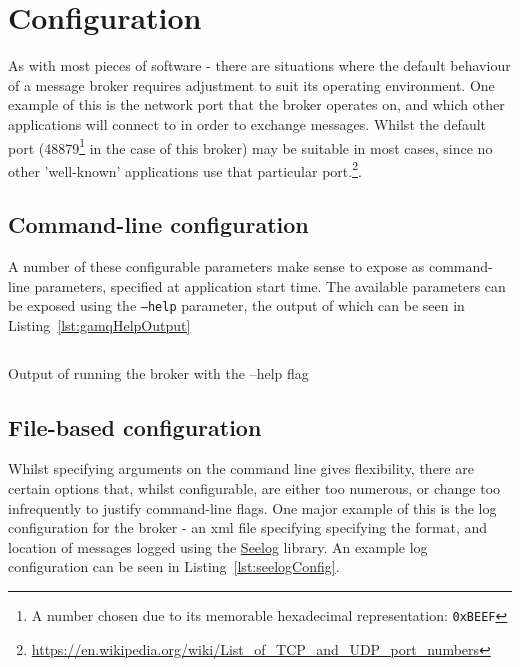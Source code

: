 \section{Configuration}
\label{sec:Configuration}

As with most pieces of software - there are situations where the default
behaviour of a message broker requires adjustment to suit its operating
environment. One example of this is the network port that the broker operates
on, and which other applications will connect to in order to exchange messages.
Whilst the default port (48879\footnote{A number chosen due to its memorable
hexadecimal representation: \texttt{0xBEEF}} in the case of this broker) may be
suitable in most cases, since no other 'well-known' applications use that
particular
port.\footnote{\url{https://en.wikipedia.org/wiki/List_of_TCP_and_UDP_port_numbers}}.

\subsection{Command-line configuration}
\label{sub:Command-line configuration}

A number of these configurable parameters make sense to expose as command-line
parameters, specified at application start time. The available parameters can be
exposed using the \texttt{--help} parameter, the output of which can be seen in
Listing~\ref{lst:gamqHelpOutput}

\begin{listing}[ht]
  \centering
  \inputminted{bash}{code/gamqHelpOutput}
  \caption{Output of running the broker with the --help flag}
  \label{lst:gamqHelpOutput}
\end{listing}

\subsection{File-based configuration}
\label{sub:File-based configuration}

Whilst specifying arguments on the command line gives flexibility, there are
certain options that, whilst configurable, are either too numerous, or change
too infrequently to justify command-line flags. One major example of this is the
log configuration for the broker - an \gls{xml} file specifying specifying the
format, and location of messages logged using the
\href{https://github.com/cihub/seelog}{Seelog} library. An example log
configuration can be seen in Listing~\ref{lst:seelogConfig}.

